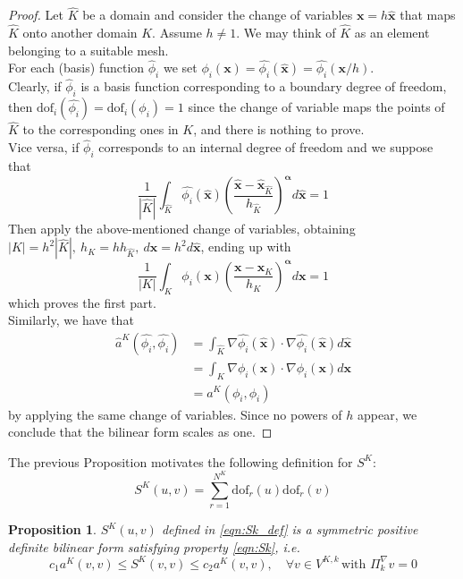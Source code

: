 \documentclass[10pt]{article}
\newcommand{\dof}{\text{dof}}
\newtheorem{prop}{Proposition}
\begin{document}
\begin{proof}
	Let $\hat{K}$ be a domain and consider the change of variables $\mathbf{x} = h \hat{\mathbf{x}}$ that maps  $\hat{K}$ onto another domain $K$. Assume $h \neq 1$. We may think of $\hat{K}$ as an element belonging to a suitable mesh. \\
	For each (basis) function $\hat{\phi}_i$ we set $\phi_i({\mathbf{x}})=\hat{\phi_i}({\hat{\mathbf{x}}})=\hat{\phi_i}({\mathbf{x}/h})$. \\
	Clearly, if $\hat{\phi}_i$ is a basis function corresponding to a boundary degree of freedom, then $\dof_i(\hat{\phi_i})=\dof_i(\phi_i)=1$ since the change of variable maps the points of $\hat{K}$ to the corresponding ones in $K$, and there is nothing to prove.\\
	Vice versa, if $\hat{\phi}_i$ corresponds to an internal degree of freedom and we suppose that $$\frac{1}{|\hat{K}|}\int_{\hat{K}} \hat{\phi_i}(\hat{\mathbf{x}}) \left( \frac{\hat{\mathbf{x}}-\hat{\mathbf{x}}_{\hat{K}}}{h_{\hat{K}}} \right)^\mathbf{\alpha} d\hat{\mathbf{x}}=1$$ Then apply the above-mentioned change of variables, obtaining $|K|=h^2|\hat{K}|, \ h_K=h h_{\hat{K}}, \ d\mathbf{x}=h^2 d\hat{\mathbf{x}}$, ending up with
	$$\frac{1}{|K|}\int_{K} \phi_i(\mathbf{x}) \left( \frac{\mathbf{x}-\mathbf{x}_{K}}{h_{K}} \right)^\mathbf{\alpha} d\mathbf{x}=1$$
	which proves the first part. \\
	Similarly, we have that
	\begin{align*}
	\hat{a}^K(\hat{\phi_i},\hat{\phi_i})&=\int_{\hat{K}} \nabla \hat{\phi_i}(\mathbf{\hat{x}}) \cdot \nabla \hat{\phi_i}(\mathbf{\hat{x}}) d\hat{\mathbf{x}} \\
	&= \int_{K} \nabla \phi_i (\mathbf{x}) \cdot \nabla \phi_i (\mathbf{x}) d\mathbf{x} \\
	&= a^K(\phi_i,\phi_i)
	\end{align*}
	by applying the same change of variables. Since no powers of $h$ appear, we conclude that the bilinear form scales as one.
\end{proof}
The previous Proposition motivates the following definition for $S^K$:
\begin{equation}
	S^K(u,v)=\sum_{r=1}^{N^K} \dof_r(u) \dof_r(v)
	\label{eqn:Sk_def}
\end{equation}
\begin{prop}
	$S^K(u,v)$ defined in \eqref{eqn:Sk_def} is a symmetric positive definite bilinear form satisfying property \eqref{eqn:Sk}, i.e.
	\begin{equation}
		c_1 a^K(v,v) \leq S^K(v,v) \leq c_2 a^K(v,v), \quad \forall v \in V^{K,k} \, \text{with } \Pi_k^\nabla v =0
	\end{equation}
\end{prop}
\end{document}
